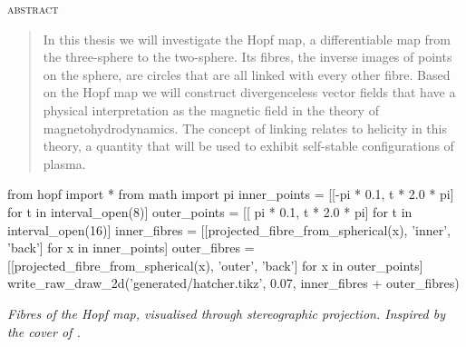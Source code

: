 
\null\vspace{5em}

\begin{center}
\textsc{abstract}
\end{center}

\begin{quote}
In this thesis we will investigate the Hopf map,
a differentiable map from the three-sphere to the two-sphere.
Its fibres, the inverse images of points on the sphere,
are circles that are all linked with every other fibre.
Based on the Hopf map we will construct divergenceless
vector fields that have a physical interpretation as
the magnetic field in the theory of magnetohydrodynamics.
The concept of linking relates to helicity in this theory,
a quantity that will be used to exhibit self-stable configurations of plasma.
\end{quote}

\clearpage

\null\vspace{5em}
\begin{center}
\begin{python}
from hopf import *
from math import pi
inner_points = [[-pi * 0.1, t * 2.0 * pi] for t in interval_open(8)]
outer_points = [[ pi * 0.1, t * 2.0 * pi] for t in interval_open(16)]
inner_fibres = [[projected_fibre_from_spherical(x), 'inner', 'back'] for x in inner_points]
outer_fibres = [[projected_fibre_from_spherical(x), 'outer', 'back'] for x in outer_points]
write_raw_draw_2d('generated/hatcher.tikz', 0.07, inner_fibres + outer_fibres)
\end{python}
\tikzexternalenable
{}
\end{center}

\vfill
\hfill\parbox{0.7\textwidth}{\raggedleft
\emph{Fibres of the Hopf map,
visualised through stereographic projection.
Inspired by the cover of \parencite{hatcher2002}.}}
\vspace{4.5em}
